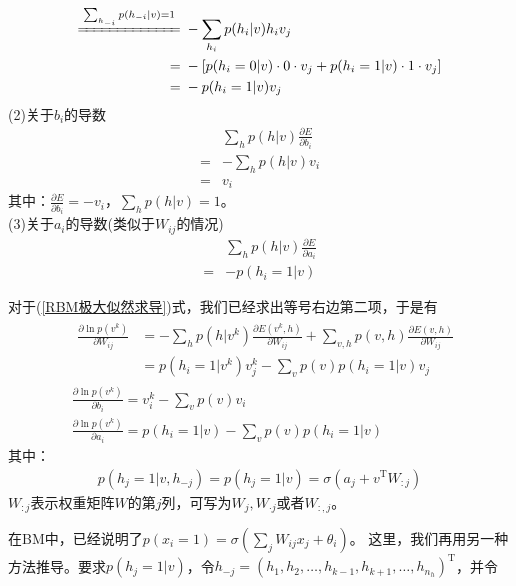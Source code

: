{\begin{align*}
            \xlongequal{\sum_{h_{-i}}p(h_{-i}|v) = 1} {}& -\sum_{h_i}p(h_i|v)h_iv_j\\
            ={}&-\left[ p(h_i=0|v)\cdot 0\cdot v_j+p(h_i = 1|v) \cdot 1\cdot v_j \right]\\
            ={}& -p(h_i=1|v)v_j
            \end{align*}
            (2)关于$b_i$的导数
            \begin{align*}
            & \sum_hp(h|v)\frac{\partial E}{\partial b_i}\\
            ={}& -\sum_hp(h|v)v_i\\
            ={}& v_i
            \end{align*}
            其中：$\frac{\partial E}{\partial b_i} = -v_i$，$\sum_h p (h|v)=1$。\\
            (3)关于$a_i$的导数(类似于$W_{ij}$的情况)
            \begin{align*}
            &\sum_hp(h|v) \frac{\partial E}{\partial a_i}\\
            ={}&-p(h_i=1|v)
            \end{align*}
            \par
            对于(\ref{RBM极大似然求导})式，我们已经求出等号右边第二项，于是有
            \begin{align*}
            & \begin{aligned}
            \frac{\partial \ln p(v^k)}{\partial W_{ij}}
            & = -\sum_hp(h|v^k)\frac{\partial E(v^k,h)}{\partial W_{ij}}+ \sum_{v,h} p(v,h)\frac{\partial E(v,h)}{\partial W_{ij}}\\
            & =p(h_i=1|v^k)v_j^k - \sum_vp(v)p(h_i = 1|v)v_j
            \end{aligned}\\
            & \frac{\partial \ln p(v^k)}{\partial b_i} = v_i^k- \sum_vp(v)v_i\\
            & \frac{\partial \ln p(v^k)}{\partial a_i} = p(h_i=1|v) - \sum_vp(v)p(h_i=1|v)
            \end{align*}
            其中：
            \begin{align*}
            p(h_j = 1|v,h_{-j}) = p(h_j=1|v) = \sigma(a_j+v^\mathrm{T}W_{:j})
            \end{align*}
            $W_{:j}$表示权重矩阵$W$的第$j$列，可写为$W_j,W_{\cdot j}$或者$W_{:,j}$。
            \begin{remark}
            在BM中，已经说明了$p(x_i=1) = \sigma(\sum_jW_{ij}x_j + \theta_i)$。
            这里，我们再用另一种方法推导。要求$p(h_j=1|v)$，令$h_{-j} = (h_1,h_2,\dots,h_{k-1},h_{k+1},\dots,h_{n_h})^\mathrm{T}$，并令

\end{remark}}
